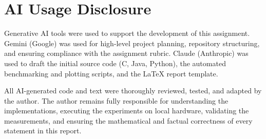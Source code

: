 \documentclass[conference,a4paper]{IEEEtran}
\begin{document}
\balance
\section*{AI Usage Disclosure}
Generative AI tools were used to support the development of this assignment. Gemini (Google) was used for high-level project planning, repository structuring, and ensuring compliance with the assignment rubric. Claude (Anthropic) was used to draft the initial source code (C, Java, Python), the automated benchmarking and plotting scripts, and the LaTeX report template. 

All AI-generated code and text were thoroughly reviewed, tested, and adapted by the author. The author remains fully responsible for understanding the implementations, executing the experiments on local hardware, validating the measurements, and ensuring the mathematical and factual correctness of every statement in this report.
\end{document}
